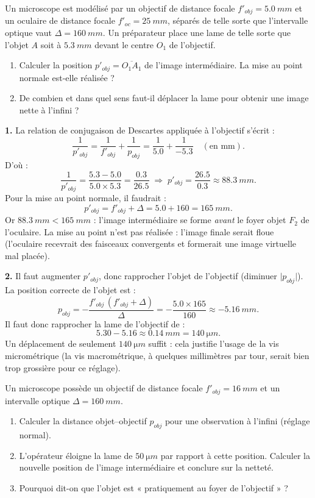 \documentclass[11pt]{article}
\begin{document}
\begin{exoresolu}
Un microscope est modélisé par un objectif de distance focale $f'_{obj} = \SI{5,0}{mm}$ et un oculaire de distance focale $f'_{oc} = \SI{25}{mm}$, séparés de telle sorte que l'intervalle optique vaut $\Delta = \SI{160}{mm}$. Un préparateur place une lame de telle sorte que l'objet $A$ soit à $\SI{5,3}{mm}$ devant le centre $O_1$ de l'objectif.
\begin{enumerate}
\item Calculer la position $p'_{obj} = \overline{O_1A_1}$ de l'image intermédiaire. La mise au point normale est-elle réalisée ?
\item De combien et dans quel sens faut-il déplacer la lame pour obtenir une image nette à l'infini ?
\end{enumerate}
\tcblower
\textbf{1.} La relation de conjugaison de Descartes appliquée à l'objectif s'écrit :
\[ \frac{1}{p'_{obj}} = \frac{1}{f'_{obj}} + \frac{1}{p_{obj}} = \frac{1}{\num{5,0}} + \frac{1}{-\num{5,3}} \quad (\text{en mm}). \]
D'où :
\[ \frac{1}{p'_{obj}} = \frac{\num{5,3} - \num{5,0}}{\num{5,0}\times\num{5,3}} = \frac{\num{0,3}}{\num{26,5}} \;\Rightarrow\; p'_{obj} = \frac{\num{26,5}}{\num{0,3}} \approx \SI{88,3}{mm}. \]
Pour la mise au point normale, il faudrait :
\[ p'_{obj} = f'_{obj} + \Delta = \num{5,0} + 160 = \SI{165}{mm}. \]
Or $\SI{88,3}{mm} < \SI{165}{mm}$ : l'image intermédiaire se forme \emph{avant} le foyer objet $F_2$ de l'oculaire. La mise au point n'est pas réalisée : l'image finale serait floue (l'oculaire recevrait des faisceaux convergents et formerait une image virtuelle mal placée).

\textbf{2.} Il faut augmenter $p'_{obj}$, donc rapprocher l'objet de l'objectif (diminuer $\lvert p_{obj} \rvert$). La position correcte de l'objet est :
\[ p_{obj} = -\frac{f'_{obj}\,(f'_{obj}+\Delta)}{\Delta} = -\frac{\num{5,0}\times 165}{160} \approx -\SI{5,16}{mm}. \]
Il faut donc rapprocher la lame de l'objectif de :
\[ \num{5,30} - \num{5,16} \approx \SI{0,14}{mm} = \SI{140}{\micro m}. \]
Un déplacement de seulement $\SI{140}{\micro m}$ suffit : cela justifie l'usage de la vis micrométrique (la vis macrométrique, à quelques millimètres par tour, serait bien trop grossière pour ce réglage).
\end{exoresolu}

\begin{exercice}
Un microscope possède un objectif de distance focale $f'_{obj} = \SI{16}{mm}$ et un intervalle optique $\Delta = \SI{160}{mm}$.
\begin{enumerate}
\item Calculer la distance objet–objectif $p_{obj}$ pour une observation à l'infini (réglage normal).
\item L'opérateur éloigne la lame de $\SI{50}{\micro m}$ par rapport à cette position. Calculer la nouvelle position de l'image intermédiaire et conclure sur la netteté.
\item Pourquoi dit-on que l'objet est « pratiquement au foyer de l'objectif » ?
\end{enumerate}
\end{exercice}
\end{document}
